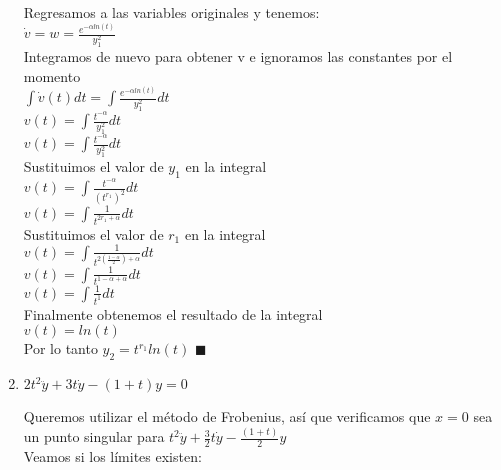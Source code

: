 \documentclass{article}
\begin{document}
\begin{enumerate}
{             Regresamos a las variables originales y tenemos:\\
             $\dot{v} = w = \frac{e^{-\alpha ln(t)}}{y_1^2}$\\
             
             Integramos de nuevo para obtener v e ignoramos las constantes por el momento\\
             $\int \dot{v}(t) dt = \int \frac{e^{-\alpha ln(t)}}{y_1^2} dt$\\
             $v(t) = \int \frac{t^{-\alpha}}{y_1^2}dt$\\
             $v(t) = \int \frac{t^{-\alpha}}{y_1^2}dt$\\
             
             Sustituimos el valor de $y_1$ en la integral\\
             $v(t) = \int \frac{t^{-\alpha}}{(t^{r_1})^2}dt$\\
             $v(t) = \int \frac{1}{t^{2r_1 + \alpha}}dt$\\
             
             Sustituimos el valor de $r_1$ en la integral\\
             $v(t) = \int \frac{1}{t^{2(\frac{1 - \alpha}{2}) + \alpha}}dt$\\
             $v(t) = \int \frac{1}{t^{1 - \alpha + \alpha}}dt$\\
             $v(t) = \int \frac{1}{t^{1}}dt$\\
             
             Finalmente obtenemos el resultado de la integral\\
              $v(t) = ln(t)$\\
              
             Por lo tanto $y_2 = t^{r_1}ln(t)$ $\blacksquare$\\
             
            
            
            
            
        }
        \item {
            $2t^2\ddot y + 3t\dot y - (1 + t)y = 0$

            \color{azul}
			Queremos utilizar el método de Frobenius, así que verificamos que $x= 0$ sea un punto singular para $ t^2\ddot{y} + \frac{3}{2}t\dot{y} - \frac{(1 + t)}{2} y$\\
			
			Veamos si los límites existen:
			
}
\end{enumerate}
\end{document}
